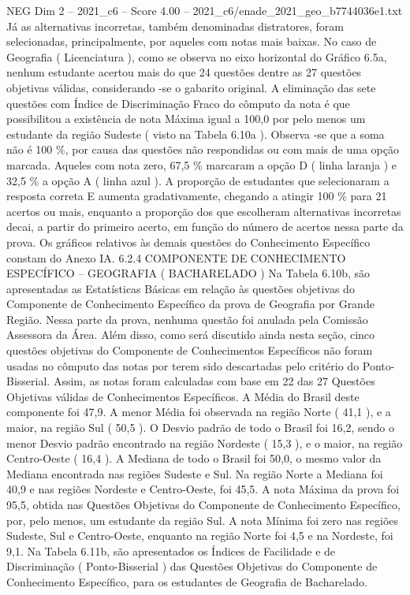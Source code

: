 \begin{textsample}{NEG Dim 2 – 2021\_c6 – Score 4.00 – 2021\_c6/enade\_2021\_geo\_b7744036e1.txt}
Já as alternativas incorretas, também denominadas distratores, foram selecionadas, principalmente, por aqueles com notas mais baixas.
No caso de Geografia ( Licenciatura ), como se observa no eixo horizontal do Gráfico 6.5a, nenhum estudante acertou mais do que 24 questões dentre as 27 questões objetivas válidas, considerando -se o gabarito original.
A eliminação das sete questões com Índice de Discriminação Fraco do cômputo da nota é que possibilitou a existência de nota Máxima igual a 100,0 por pelo menos um estudante da região Sudeste ( visto na Tabela 6.10a ).
Observa -se que a soma não é 100 \%, por causa das questões não respondidas ou com mais de uma opção marcada.
Aqueles com nota zero, 67,5 \% marcaram a opção D ( linha laranja ) e 32,5 \% a opção A ( linha azul ).
A proporção de estudantes que selecionaram a resposta correta E aumenta gradativamente, chegando a atingir 100 \% para 21 acertos ou mais, enquanto a proporção dos que escolheram alternativas incorretas decai, a partir do primeiro acerto, em função do número de acertos nessa parte da prova.
Os gráficos relativos às demais questões do Conhecimento Específico constam do Anexo IA. 6.2.4 COMPONENTE DE CONHECIMENTO ESPECÍFICO – GEOGRAFIA ( BACHARELADO ) Na Tabela 6.10b, são apresentadas as Estatísticas Básicas em relação às questões objetivas do Componente de Conhecimento Específico da prova de Geografia por Grande Região.
Nessa parte da prova, nenhuma questão foi anulada pela Comissão Assessora da Área.
Além disso, como será discutido ainda nesta seção, cinco questões objetivas do Componente de Conhecimentos Específicos não foram usadas no cômputo das notas por terem sido descartadas pelo critério do Ponto-Bisserial.
Assim, as notas foram calculadas com base em 22 das 27 Questões Objetivas válidas de Conhecimentos Específicos.
A Média do Brasil deste componente foi 47,9.
A menor Média foi observada na região Norte ( 41,1 ), e a maior, na região Sul ( 50,5 ).
O Desvio padrão de todo o Brasil foi 16,2, sendo o menor Desvio padrão encontrado na região Nordeste ( 15,3 ), e o maior, na região Centro-Oeste ( 16,4 ).
A Mediana de todo o Brasil foi 50,0, o mesmo valor da Mediana encontrada nas regiões Sudeste e Sul.
Na região Norte a Mediana foi 40,9 e nas regiões Nordeste e Centro-Oeste, foi 45,5.
A nota Máxima da prova foi 95,5, obtida nas Questões Objetivas do Componente de Conhecimento Específico, por, pelo menos, um estudante da região Sul.
A nota Mínima foi zero nas regiões Sudeste, Sul e Centro-Oeste, enquanto na região Norte foi 4,5 e na Nordeste, foi 9,1.
Na Tabela 6.11b, são apresentados os Índices de Facilidade e de Discriminação ( Ponto-Bisserial ) das Questões Objetivas do Componente de Conhecimento Específico, para os estudantes de Geografia de Bacharelado.

\end{textsample}
